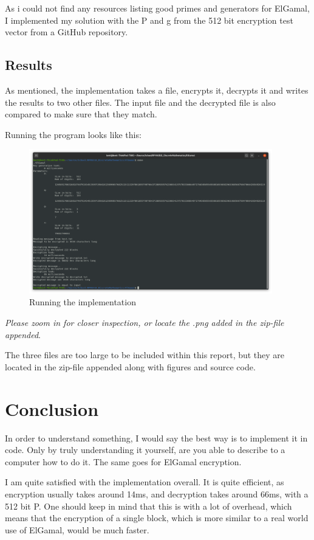 \documentclass{article}
\begin{document}
As i could not find any resources listing good primes and generators for ElGamal, I implemented my solution with the P and g from the 512 bit encryption test vector from a GitHub repository\cite{PG}.
\subsection{Results}

As mentioned, the implementation takes a file, encrypts it, decrypts it and writes the results to two other files. The input file and the decrypted file is also compared to make sure that they match.

Running the program looks like this:

\begin{figure}[H]
 \centering
  \includegraphics[width=300pt]{img/make.png}
 \caption{Running the implementation}
 \label{MAKE}
 \end{figure}
\textit{Please zoom in for closer inspection, or locate the .png added in the zip-file appended}.


The three files are too large to be included within this report, but they are located in the zip-file appended along with figures and source code.

\section{Conclusion}
In order to understand something, I would say the best way is to implement it in code. Only by truly understanding it yourself, are you able to describe to a computer how to do it. The same goes for ElGamal encryption.

I am quite satisfied with the implementation overall. It is quite efficient, as encryption usually takes around 14ms, and decryption takes around 66ms, with a 512 bit P. One should keep in mind that this is with a lot of overhead, which means that the encryption of a single block, which is more similar to a real world use of ElGamal, would be much faster.
\end{document}
